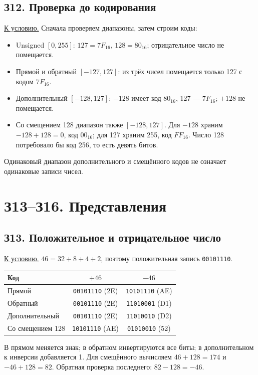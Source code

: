 \subsection*{З12. Проверка до кодирования}\label{sol:z12}
\hyperref[task:z12]{К условию.}
Сначала проверяем диапазоны, затем строим коды:
\begin{itemize}
    \item Unsigned $[0,255]$: $127=7F_{16}$, $128=80_{16}$; отрицательное число не помещается.
    \item Прямой и обратный $[-127,127]$: из трёх чисел помещается только 127 с кодом $7F_{16}$.
    \item Дополнительный $[-128,127]$: $-128$ имеет код $80_{16}$, 127 --- $7F_{16}$; $+128$ не помещается.
    \item Со смещением 128 диапазон также $[-128,127]$. Для $-128$ храним $-128+128=0$, код $00_{16}$; для 127 храним 255, код $FF_{16}$. Число 128 потребовало бы код 256, то есть девять битов.
\end{itemize}
Одинаковый диапазон дополнительного и смещённого кодов не означает одинаковые записи чисел.

\section{З13--З16. Представления}
\subsection*{З13. Положительное и отрицательное число}\label{sol:z13}
\hyperref[task:z13]{К условию.}
$46=32+8+4+2$, поэтому положительная запись \texttt{00101110}.
\begin{center}
\small
\begin{tabular}{l|c|c}
Код & $+46$ & $-46$\\\hline
Прямой & \texttt{00101110} (2E) & \texttt{10101110} (AE)\\
Обратный & \texttt{00101110} (2E) & \texttt{11010001} (D1)\\
Дополнительный & \texttt{00101110} (2E) & \texttt{11010010} (D2)\\
Со смещением 128 & \texttt{10101110} (AE) & \texttt{01010010} (52)
\end{tabular}
\end{center}
В прямом меняется знак; в обратном инвертируются все биты; в дополнительном к инверсии добавляется 1. Для смещённого вычисляем $46+128=174$ и $-46+128=82$. Обратная проверка последнего: $82-128=-46$.

